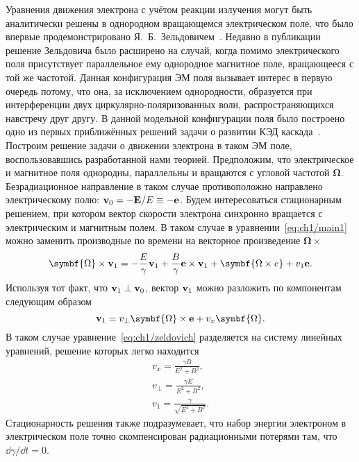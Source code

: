 Уравнения движения электрона с учётом реакции излучения могут быть аналитически решены в однородном вращающемся электрическом поле, что было впервые продемонстрировано Я.~Б.~Зельдовичем~\cite{Zeldovich75}. 
Недавно в публикации~\cite{Kostyukov2016} решение Зельдовича было расширено на случай, когда помимо электрического поля присутствует параллельное ему однородное магнитное поле, вращающееся с той же частотой.
Данная конфигурация ЭМ поля вызывает интерес в первую очередь потому, что она, за исключением однородности, образуется при интерференции двух циркулярно-поляризованных волн, распространяющихся навстречу друг другу.
В данной модельной конфигурации поля было построено одно из первых приближённых решений задачи о развитии КЭД каскада~\cite{fedotov2010limitations, elkina2011qed}.
Построим решение задачи о движении электрона в таком ЭМ поле, воспользовавшись разработанной нами теорией.
Предположим, что электрическое и магнитное поля однородны, параллельны и вращаются с угловой частотой $\symbf{\Omega}$.
Безрадиационное направление в таком случае противоположно направлено электрическому полю: ${\vb{v}_0 = -\vb{E}/E \equiv -\vb{e}}$.
Будем интересоваться стационарным решением, при котором вектор скорости электрона синхронно вращается с электрическим и магнитным полем.
В таком случае в уравнении~\eqref{eq:ch1/main1} можно заменить производные по времени на векторное произведение $\symbf{\Omega}\times$
\begin{equation}
    \label{eq:ch1/zeldovich}
    \symbf{\Omega}\times\vb{v}_1 = -\frac{E}{\gamma}\vb{v}_1 + \frac{B}{\gamma}\vb{e\times v}_1 + \symbf{\Omega\times e} + v_1 \vb{e}.
\end{equation}
Используя тот факт, что $\vb{v}_1 \perp \vb{v}_0$, вектор $\vb{v}_1$ можно разложить по компонентам следующим образом
\begin{equation}
    \vb{v}_1 = v_\perp \symbf{\Omega}\times\vb{e} + v_x \symbf{\Omega} .
\end{equation}
В таком случае уравнение~\eqref{eq:ch1/zeldovich} разделяется на систему линейных уравнений, решение которых легко находится
\begin{gather}
    \label{eq:ch1/Zeld_sol1}
    v_x = \frac{\gamma B}{E^2 + B^2} ,\\
    \label{eq:ch1/Zeld_sol2}
    v_\perp = \frac{\gamma E}{E^2 + B^2}, \\
    v_1 = \frac{\gamma}{\sqrt{E^2 + B^2}} .
\end{gather}
Стационарность решения также подразумевает, что набор энергии электроном в электрическом поле точно скомпенсирован радиационными потерями там, что $\dd\gamma/\dd t = 0$.
